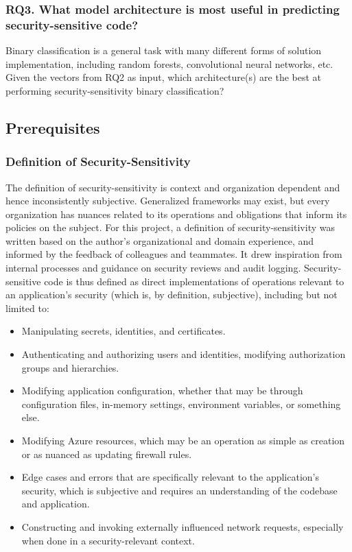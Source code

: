 \documentclass[11pt]{article}
\begin{document}
\subsubsection*{RQ3. What model architecture is most useful in predicting security-sensitive code?}\label{rq3.-what-model-architecture-is-most-useful-in-predicting-security-sensitive-code}

Binary classification is a general task with many different forms of
solution implementation, including random forests, convolutional neural
networks, etc. Given the vectors from RQ2 as input, which
architecture(s) are the best at performing security-sensitivity binary
classification?

\subsection{Prerequisites}\label{prerequisites}

\subsubsection{Definition of Security-Sensitivity}\label{definition-of-security-sensitivity}

The definition of security-sensitivity is context and organization
dependent and hence inconsistently subjective. Generalized frameworks
may exist, but every organization has nuances related to its operations
and obligations that inform its policies on the subject. For this
project, a definition of security-sensitivity was written based on the 
author's organizational and domain experience, and informed by the 
feedback of colleagues and teammates. It
drew inspiration from internal processes and guidance on security
reviews and audit logging. Security-sensitive code is thus defined as 
direct implementations of operations relevant
to an application's security (which is, by definition, subjective),
including but not limited to:

\begin{itemize}
\item
  Manipulating secrets, identities, and certificates.
\item
  Authenticating and authorizing users and identities, modifying
  authorization groups and hierarchies.
\item
  Modifying application configuration, whether that may be through
  configuration files, in-memory settings, environment variables, or
  something else.
\item
  Modifying Azure resources, which may be an operation as simple as
  creation or as nuanced as updating firewall rules.
\item
  Edge cases and errors that are specifically relevant to the
  application's security, which is subjective and requires an
  understanding of the codebase and application.
\item
  Constructing and invoking externally influenced network requests,
  especially when done in a security-relevant context.
\end{itemize}
\end{document}
